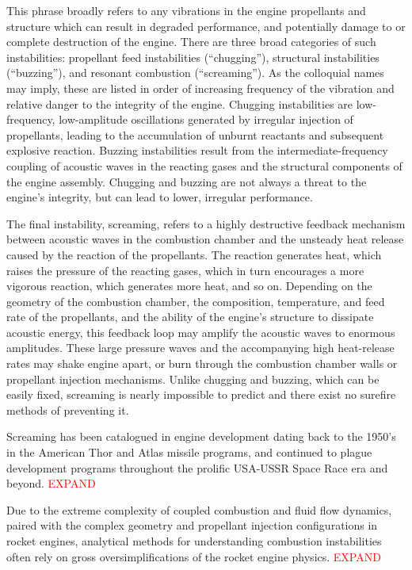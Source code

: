 This phrase broadly refers to any vibrations in the engine propellants and structure which can result in degraded performance, and potentially damage to or complete destruction of the engine. There are three broad categories of such instabilities: propellant feed instabilities (``chugging''), structural instabilities (``buzzing''), and resonant combustion (``screaming''). As the colloquial names may imply, these are listed in order of increasing frequency of the vibration and relative danger to the integrity of the engine. Chugging instabilities are low-frequency, low-amplitude oscillations generated by irregular injection of propellants, leading to the accumulation of unburnt reactants and subsequent explosive reaction. Buzzing instabilities result from the intermediate-frequency coupling of acoustic waves in the reacting gases and the structural components of the engine assembly. Chugging and buzzing are not always a threat to the engine's integrity, but can lead to lower, irregular performance.

The final instability, screaming, refers to a highly destructive feedback mechanism between acoustic waves in the combustion chamber and the unsteady heat release caused by the reaction of the propellants. The reaction generates heat, which raises the pressure of the reacting gases, which in turn encourages a more vigorous reaction, which generates more heat, and so on. Depending on the geometry of the combustion chamber, the composition, temperature, and feed rate of the propellants, and the ability of the engine's structure to dissipate acoustic energy, this feedback loop may amplify the acoustic waves to enormous amplitudes. These large pressure waves and the accompanying high heat-release rates may shake engine apart, or burn through the combustion chamber walls or propellant injection mechanisms. Unlike chugging and buzzing, which can be easily fixed, screaming is nearly impossible to predict and there exist no surefire methods of preventing it.

Screaming has been catalogued in engine development dating back to the 1950's in the American Thor and Atlas missile programs, and continued to plague development programs throughout the prolific USA-USSR Space Race era and beyond. \textcolor{red}{EXPAND}

Due to the extreme complexity of coupled combustion and fluid flow dynamics, paired with the complex geometry and propellant injection configurations in rocket engines, analytical methods for understanding combustion instabilities often rely on gross oversimplifications of the rocket engine physics. \textcolor{red}{EXPAND}


